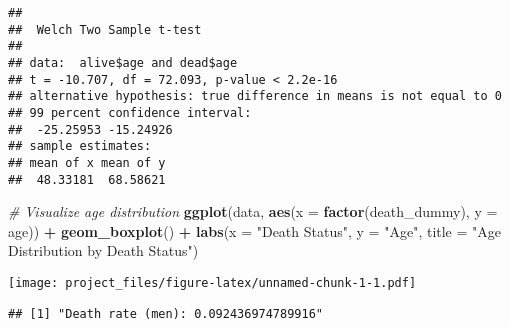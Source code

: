 \documentclass[
]{article}
\newenvironment{Shaded}{\begin{snugshade}}{\end{snugshade}}
\newcommand{\AttributeTok}[1]{\textcolor[rgb]{0.13,0.29,0.53}{#1}}
\newcommand{\CommentTok}[1]{\textcolor[rgb]{0.56,0.35,0.01}{\textit{#1}}}
\newcommand{\ConstantTok}[1]{\textcolor[rgb]{0.56,0.35,0.01}{#1}}
\newcommand{\FunctionTok}[1]{\textcolor[rgb]{0.13,0.29,0.53}{\textbf{#1}}}
\newcommand{\NormalTok}[1]{#1}
\newcommand{\OtherTok}[1]{\textcolor[rgb]{0.56,0.35,0.01}{#1}}
\newcommand{\SpecialCharTok}[1]{\textcolor[rgb]{0.81,0.36,0.00}{\textbf{#1}}}
\newcommand{\StringTok}[1]{\textcolor[rgb]{0.31,0.60,0.02}{#1}}
\begin{document}
\begin{verbatim}
## 
##  Welch Two Sample t-test
## 
## data:  alive$age and dead$age
## t = -10.707, df = 72.093, p-value < 2.2e-16
## alternative hypothesis: true difference in means is not equal to 0
## 99 percent confidence interval:
##  -25.25953 -15.24926
## sample estimates:
## mean of x mean of y 
##  48.33181  68.58621
\end{verbatim}

\begin{Shaded}
\begin{Highlighting}[]
\CommentTok{\# Visualize age distribution}
\FunctionTok{ggplot}\NormalTok{(data, }\FunctionTok{aes}\NormalTok{(}\AttributeTok{x =} \FunctionTok{factor}\NormalTok{(death\_dummy), }\AttributeTok{y =}\NormalTok{ age)) }\SpecialCharTok{+}
  \FunctionTok{geom\_boxplot}\NormalTok{() }\SpecialCharTok{+}
  \FunctionTok{labs}\NormalTok{(}\AttributeTok{x =} \StringTok{"Death Status"}\NormalTok{, }\AttributeTok{y =} \StringTok{"Age"}\NormalTok{, }\AttributeTok{title =} \StringTok{"Age Distribution by Death Status"}\NormalTok{)}
\end{Highlighting}
\end{Shaded}

\texttt{[image: project\_files/figure-latex/unnamed-chunk-1-1.pdf]}

\begin{Shaded}
\end{Shaded}

\begin{verbatim}
## [1] "Death rate (men): 0.092436974789916"
\end{verbatim}
\end{document}
